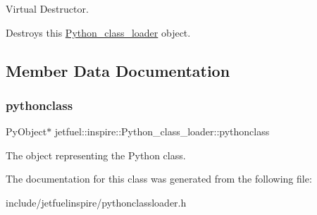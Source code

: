 Virtual Destructor. 

Destroys this \hyperlink{classjetfuel_1_1inspire_1_1Python__class__loader}{Python\+\_\+class\+\_\+loader} object. 

\subsection{Member Data Documentation}
\mbox{\label{classjetfuel_1_1inspire_1_1Python__class__loader_adbcf46681199db320a6b09aec18a2ca8}} 
\subsubsection{\texorpdfstring{pythonclass}{pythonclass}}
{\footnotesize\ttfamily Py\+Object$\ast$ jetfuel\+::inspire\+::\+Python\+\_\+class\+\_\+loader\+::pythonclass}

The object representing the Python class. 

The documentation for this class was generated from the following file\+:\begin{DoxyCompactItemize}
\item 
include/jetfuelinspire/pythonclassloader.\+h\end{DoxyCompactItemize}

